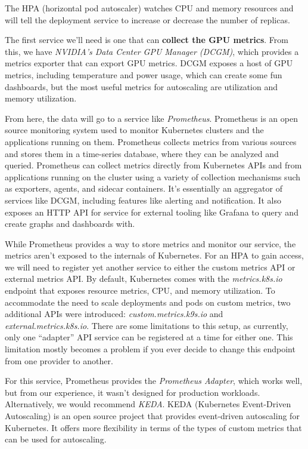 The HPA (horizontal pod autoscaler) watches CPU and memory resources and will tell the deployment service to increase or decrease the number of replicas. 

The first service we'll need is one that can \textbf{collect the GPU metrics}. From this, we have \textit{NVIDIA's Data Center GPU Manager (DCGM)}, which provides a metrics exporter that can export GPU metrics. DCGM exposes a host of GPU metrics, including temperature and power usage, which can create some fun dashboards, but the most useful metrics for autoscaling are utilization and memory utilization. 

From here, the data will go to a service like \textit{Prometheus}. Prometheus is an open source monitoring system used to monitor Kubernetes clusters and the applications running on them. Prometheus collects metrics from various sources and stores them in a time-series database, where they can be analyzed and queried. Prometheus can collect metrics directly from Kubernetes APIs and from applications running on the cluster using a variety of collection mechanisms such as exporters, agents, and sidecar containers. It's essentially an aggregator of services like DCGM, including features like alerting and notification. It also exposes an HTTP API for service for external tooling like Grafana to query and create graphs and dashboards with.

While Prometheus provides a way to store metrics and monitor our service, the metrics aren't exposed to the internals of Kubernetes. For an HPA to gain access, we will need to register yet another service to either the custom metrics API or external metrics API. By default, Kubernetes comes with the \textit{metrics.k8s.io} endpoint that exposes resource metrics, CPU, and memory utilization. To accommodate the need to scale deployments and pods on custom metrics, two additional APIs were introduced: \textit{custom.metrics.k9s.io} and \textit{external.metrics.k8s.io}. There are some limitations to this setup, as currently, only one ``adapter'' API service can be registered at a time for either one. This limitation mostly becomes a problem if you ever decide to change this endpoint from one provider to another.

For this service, Prometheus provides the \textit{Prometheus Adapter}, which works well, but from our experience, it wasn't designed for production workloads. Alternatively, we would recommend \textit{KEDA}. KEDA (Kubernetes Event-Driven Autoscaling) is an open source project that provides event-driven autoscaling for Kubernetes. It offers more flexibility in terms of the types of custom metrics that can be used for autoscaling.

